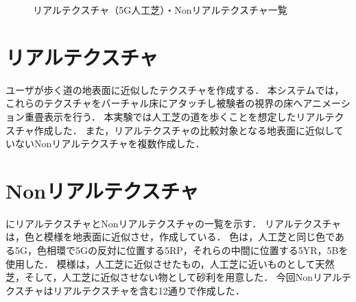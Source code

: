 \begin{figure}[ht]
    \centering
    \caption{リアルテクスチャ（5G人工芝）・Nonリアルテクスチャ一覧}
    \label{fig:Nrial}
\end{figure}


\section{リアルテクスチャ}
ユーザが歩く道の地表面に近似したテクスチャを作成する．
本システムでは，これらのテクスチャをバーチャル床にアタッチし被験者の視界の床へアニメーション重畳表示を行う．
本実験では人工芝の道を歩くことを想定したリアルテクスチャ作成した．
また，リアルテクスチャの比較対象となる地表面に近似していないNonリアルテクスチャを複数作成した．

\section{Nonリアルテクスチャ}
にリアルテクスチャとNonリアルテクスチャの一覧を示す．
リアルテクスチャは，色と模様を地表面に近似させ，作成している．
色は，人工芝と同じ色である5G，色相環で5Gの反対に位置する5RP，それらの中間に位置する5YR，5Bを使用した\cite{color}．
模様は，人工芝に近似させたもの，人工芝に近いものとして天然芝，そして，人工芝に近似させない物として砂利を用意した．
今回Nonリアルテクスチャはリアルテクスチャを含む12通りで作成した．


